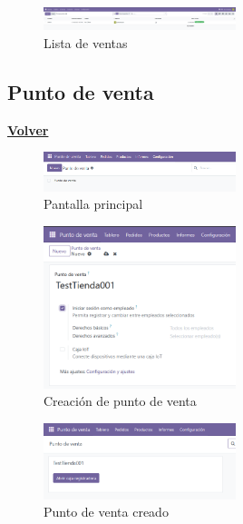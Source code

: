 \documentclass[a4paper,12pt]{article}
\begin{document}
\begin{figure}[h!]
    \centering
    \includegraphics[width=0.5\textwidth]{pr2odoo47-listaVentas.png}
    \caption{Lista de ventas}
\end{figure}
\FloatBarrier

\subsection{Punto de venta}
\hyperlink{anchor-indice}{\textbf{Volver}}\\

\begin{figure}[h!]
    \centering
    \includegraphics[width=0.5\textwidth]{pr2odoo48-pantallaPrincipal.png}
    \caption{Pantalla principal}
\end{figure}
\FloatBarrier

\begin{figure}[h!]
    \centering
    \includegraphics[width=0.5\textwidth]{pr2odoo49-nuevoTPV.png}
    \caption{Creación de punto de venta}
\end{figure}
\FloatBarrier

\begin{figure}[h!]
    \centering
    \includegraphics[width=0.5\textwidth]{pr2odoo50-tpvCreado.png}
    \caption{Punto de venta creado}
\end{figure}
\FloatBarrier
\end{document}
